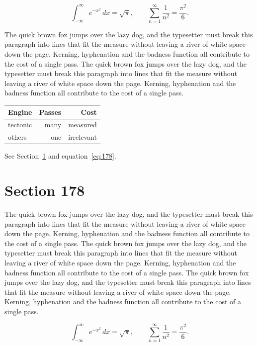 \documentclass{article}
\begin{document}
\begin{equation}\label{eq:177}
\int_{-\infty}^{\infty} e^{-x^{2}}\,dx = \sqrt{\pi}, \qquad
\sum_{n=1}^{\infty} \frac{1}{n^{2}} = \frac{\pi^{2}}{6}.
\end{equation}

The quick brown fox jumps over the lazy dog, and the typesetter must break this paragraph into lines that fit the measure without leaving a river of white space down the page. Kerning, hyphenation and the badness function all contribute to the cost of a single pass. The quick brown fox jumps over the lazy dog, and the typesetter must break this paragraph into lines that fit the measure without leaving a river of white space down the page. Kerning, hyphenation and the badness function all contribute to the cost of a single pass. 

\begin{center}
\begin{tabular}{lrr}
\toprule
Engine & Passes & Cost \\
\midrule
tectonic & many & measured \\
others & one & irrelevant \\
\bottomrule
\end{tabular}
\end{center}

See Section~\ref{sec:178} and equation~\eqref{eq:178}.
\section{Section 178}
\label{sec:178}
The quick brown fox jumps over the lazy dog, and the typesetter must break this paragraph into lines that fit the measure without leaving a river of white space down the page. Kerning, hyphenation and the badness function all contribute to the cost of a single pass. The quick brown fox jumps over the lazy dog, and the typesetter must break this paragraph into lines that fit the measure without leaving a river of white space down the page. Kerning, hyphenation and the badness function all contribute to the cost of a single pass. The quick brown fox jumps over the lazy dog, and the typesetter must break this paragraph into lines that fit the measure without leaving a river of white space down the page. Kerning, hyphenation and the badness function all contribute to the cost of a single pass. 

\begin{equation}\label{eq:178}
\int_{-\infty}^{\infty} e^{-x^{2}}\,dx = \sqrt{\pi}, \qquad
\sum_{n=1}^{\infty} \frac{1}{n^{2}} = \frac{\pi^{2}}{6}.
\end{equation}
\end{document}
